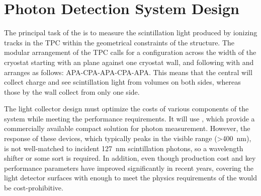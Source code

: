 \section{Photon Detection System Design}
\label{sec:fdsp-pd-design}



The principal task of the   is to measure the  scintillation light produced by ionizing tracks in the TPC within the geometrical constraints of the  structure. 
The modular arrangement of the  TPC calls for a configuration across the width of the cryostat starting with an  plane against one cryostat wall, and following with  and  arranges as follows:  APA-CPA-APA-CPA-APA. This means that the central  will collect charge and see scintillation light from \lar volumes on both sides, whereas those by the wall collect from only one side. 


The light collector design must optimize the costs of various components of the system while meeting the performance requirements.  It will use , which provide a commercially available compact solution for photon measurement.  However, the response of these devices, which typically peaks in the visible range (>\SI{400}{nm}), is not well-matched to incident \SI{127}{nm} scintillation photons, so a wavelength shifter or some sort is required.  In addition, even though production cost and key performance parameters have improved significantly in recent years, covering the light detector surfaces with enough  to meet the physics requirements of the  would be cost-prohibitive. 

